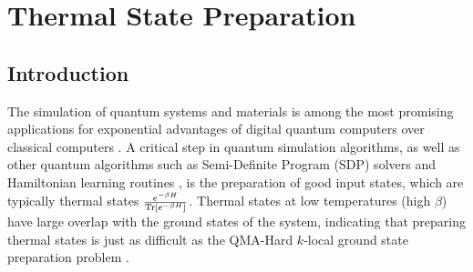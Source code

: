 
\newcommand{\trace}[1]{\Tr \brackets{ #1 }}
\newcommand{\partrace}[2]{\Tr_{#1} \brackets{ #2 }}
\newcommand{\complex}{\mathbb{C}}
\newcommand{\hilb}{\mathcal{H}}
\newcommand{\partfun}{\mathcal{Z}}
\newcommand{\identity}{\mathds{1}}
\newcommand{\gue}{\rm GUE}
\newcommand{\herm}[1]{\hermMathOp\parens{#1}}
\newcommand{\on}{\rm on}
\newcommand{\off}{\rm off}
\newcommand{\haar}{\text{Haar}}
\newcommand{\EE}{\mathbb{E}}
\newcommand{\TT}{\mathcal{T}}

\chapter{Thermal State Preparation}

\section{Introduction}

The simulation of quantum systems and materials is among the most promising applications for exponential advantages of digital quantum computers over classical computers \cite{aspuru2005simulated} \cite{reiher2017elucidating} \cite{tensorHypercontraction}. A critical step in quantum simulation algorithms, as well as other quantum algorithms such as Semi-Definite Program (SDP) solvers \cite{brandao2019sdp} and Hamiltonian learning routines \cite{anshu_sample-efficient_2021}, is the preparation of good input states, which are typically thermal states $\frac{e^{-\beta H}}{\trace{e^{-\beta H}}}$. Thermal states at low temperatures (high $\beta$) have large overlap with the ground states of the system, indicating that preparing thermal states is just as difficult as the QMA-Hard $k$-local ground state preparation problem \cite{kempe2005complexitylocalhamiltonianproblem}. 

